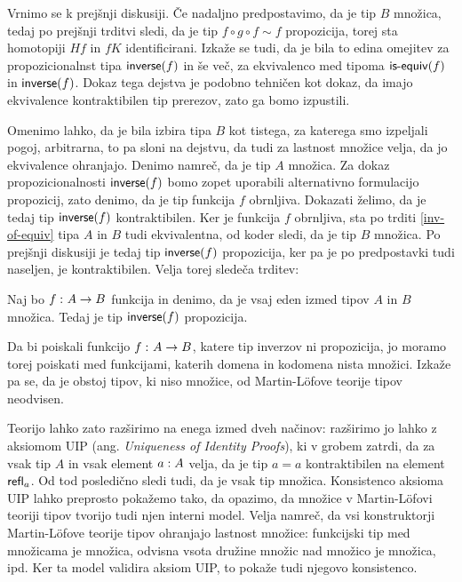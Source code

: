 Vrnimo se k prejšnji diskusiji. Če nadaljno predpostavimo, da je tip \(B\) množica, tedaj po prejšnji trditvi sledi, da je tip \(f \circ g \circ f \sim f\) propozicija, torej sta homotopiji \(Hf\) in \(fK\) identificirani. Izkaže se tudi, da je bila to edina omejitev za propozicionalnst tipa \(\textnormal{\textsf{inverse}}(f)\) in še več, za ekvivalenco med tipoma \(\textnormal{\textsf{is-equiv}}(f)\) in \(\textnormal{\textsf{inverse}}(f)\). Dokaz tega dejstva je podobno tehničen kot dokaz, da imajo ekvivalence kontraktibilen tip prerezov, zato ga bomo izpustili.

\begin{opomba}
  Omenimo lahko, da je bila izbira tipa \(B\) kot tistega, za katerega smo izpeljali pogoj, arbitrarna, to pa sloni na dejstvu, da tudi za lastnost množice velja, da jo ekvivalence ohranjajo. Denimo namreč, da je tip \(A\) množica. Za dokaz propozicionalnosti \(\textnormal{\textsf{inverse}}(f)\) bomo zopet uporabili alternativno formulacijo propozicij, zato denimo, da je tip funkcija \(f\) obrnljiva. Dokazati želimo, da je tedaj tip \(\textnormal{\textsf{inverse}}(f)\) kontraktibilen. Ker je funkcija \(f\) obrnljiva, sta po trditi \ref{inv-of-equiv} tipa \(A\) in \(B\) tudi ekvivalentna, od koder sledi, da je tip \(B\) množica. Po prejšnji diskusiji je tedaj tip \(\textnormal{\textsf{inverse}}(f)\) propozicija, ker pa je po predpostavki tudi naseljen, je kontraktibilen. Velja torej sledeča trditev:
\end{opomba}

\begin{izrek}
  Naj bo \(f \,\colon A \to B\) funkcija in denimo, da je vsaj eden izmed tipov \(A\) in \(B\) množica. Tedaj je tip \(\textnormal{\textsf{inverse}}(f)\) propozicija.
\end{izrek}

Da bi poiskali funkcijo \(f \,\colon A \to B\), katere tip inverzov ni propozicija, jo moramo torej poiskati med funkcijami, katerih domena in kodomena nista množici. Izkaže pa se, da je obstoj tipov, ki niso množice, od Martin-Löfove teorije tipov neodvisen.

Teorijo lahko zato razširimo na enega izmed dveh načinov: razširimo jo lahko z aksiomom UIP (ang. \emph{Uniqueness of Identity Proofs}), ki v grobem zatrdi, da za vsak tip \(A\) in vsak element \({a : A}\) velja, da je tip \(a = a\) kontraktibilen na element \(\textnormal{\textsf{refl}}_{a}\). Od tod posledično sledi tudi, da je vsak tip množica. Konsistenco aksioma UIP lahko preprosto pokažemo tako, da opazimo, da množice v Martin-Löfovi teoriji tipov tvorijo tudi njen interni model. Velja namreč, da vsi konstruktorji Martin-Löfove teorije tipov ohranjajo lastnost množice: funkcijski tip med množicama je množica, odvisna vsota družine množic nad množico je množica, ipd. Ker ta model validira aksiom UIP, to pokaže tudi njegovo konsistenco.

